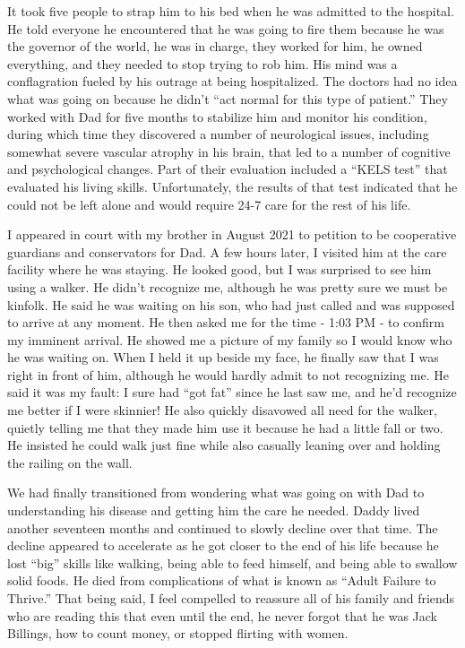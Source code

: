 \documentclass{article}
\begin{document}
It took five people to strap him to his bed when he was admitted to the hospital. He told everyone he encountered that he was going to fire them because he was the governor of the world, he was in charge, they worked for him, he owned everything, and they needed to stop trying to rob him. His mind was a conflagration fueled by his outrage at being hospitalized. The doctors had no idea what was going on because he didn't ``act normal for this type of patient.'' They worked with Dad for five months to stabilize him and monitor his condition, during which time they discovered a number of neurological issues, including somewhat severe vascular atrophy in his brain, that led to a number of cognitive and psychological changes. Part of their evaluation included a ``KELS test'' that evaluated his living skills. Unfortunately, the results of that test indicated that he could not be left alone and would require 24-7 care for the rest of his life.

I appeared in court with my brother in August 2021 to petition to be cooperative guardians and conservators for Dad. A few hours later, I visited him at the care facility where he was staying. He looked good, but I was surprised to see him using a walker. He didn't recognize me, although he was pretty sure we must be kinfolk. He said he was waiting on his son, who had just called and was supposed to arrive at any moment. He then asked me for the time - 1:03 PM - to confirm my imminent arrival. He showed me a picture of my family so I would know who he was waiting on. When I held it up beside my face, he finally saw that I was right in front of him, although he would hardly admit to not recognizing me. He said it was my fault: I sure had ``got fat'' since he last saw me, and he'd recognize me better if I were skinnier! He also quickly disavowed all need for the walker, quietly telling me that they made him use it because he had a little fall or two. He insisted he could walk just fine while also casually leaning over and holding the railing on the wall.

We had finally transitioned from wondering what was going on with Dad to understanding his disease and getting him the care he needed. Daddy lived another seventeen months and continued to slowly decline over that time. The decline appeared to accelerate as he got closer to the end of his life because he lost ``big'' skills like walking, being able to feed himself, and being able to swallow solid foods. He died from complications of what is known as ``Adult Failure to Thrive.'' That being said, I feel compelled to reassure all of his family and friends who are reading this that even until the end, he never forgot that he was Jack Billings, how to count money, or stopped flirting with women.
\end{document}
